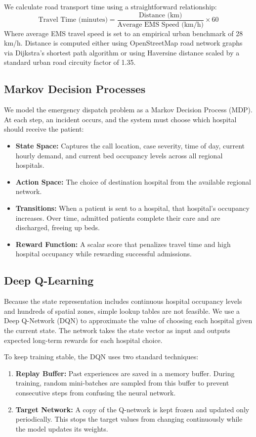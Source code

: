 \documentclass[11pt,a4paper]{article}
\begin{document}
We calculate road transport time using a straightforward relationship:
\begin{equation}
    \text{Travel Time (minutes)} = \frac{\text{Distance (km)}}{\text{Average EMS Speed (km/h)}} \times 60
\end{equation}
Where average EMS travel speed is set to an empirical urban benchmark of 28 km/h. Distance is computed either using OpenStreetMap road network graphs via Dijkstra's shortest path algorithm or using Haversine distance scaled by a standard urban road circuity factor of 1.35.

\subsection{Markov Decision Processes}
We model the emergency dispatch problem as a Markov Decision Process (MDP). At each step, an incident occurs, and the system must choose which hospital should receive the patient:
\begin{itemize}[leftmargin=*]
    \item \textbf{State Space:} Captures the call location, case severity, time of day, current hourly demand, and current bed occupancy levels across all regional hospitals.
    \item \textbf{Action Space:} The choice of destination hospital from the available regional network.
    \item \textbf{Transitions:} When a patient is sent to a hospital, that hospital's occupancy increases. Over time, admitted patients complete their care and are discharged, freeing up beds.
    \item \textbf{Reward Function:} A scalar score that penalizes travel time and high hospital occupancy while rewarding successful admissions.
\end{itemize}

\subsection{Deep Q-Learning}
Because the state representation includes continuous hospital occupancy levels and hundreds of spatial zones, simple lookup tables are not feasible. We use a Deep Q-Network (DQN) to approximate the value of choosing each hospital given the current state. The network takes the state vector as input and outputs expected long-term rewards for each hospital choice.

To keep training stable, the DQN uses two standard techniques:
\begin{enumerate}[leftmargin=*]
    \item \textbf{Replay Buffer:} Past experiences are saved in a memory buffer. During training, random mini-batches are sampled from this buffer to prevent consecutive steps from confusing the neural network.
    \item \textbf{Target Network:} A copy of the Q-network is kept frozen and updated only periodically. This stops the target values from changing continuously while the model updates its weights.
\end{enumerate}
\end{document}
